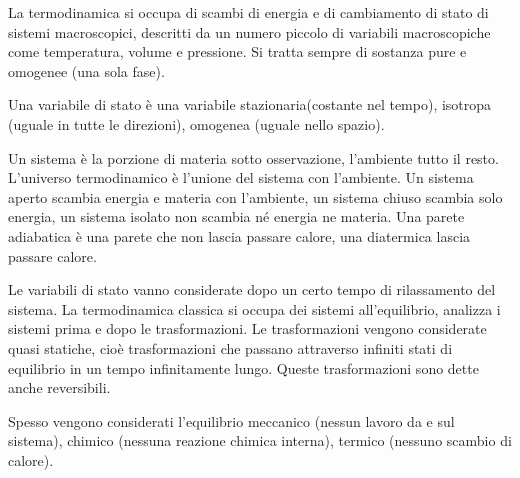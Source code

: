 La termodinamica si occupa di scambi di energia e di cambiamento di stato di sistemi macroscopici, descritti da un numero piccolo di variabili macroscopiche come temperatura, volume e pressione. Si tratta sempre di sostanza pure e omogenee (una sola fase).

Una variabile di stato è una variabile stazionaria(costante nel tempo), isotropa (uguale in tutte le direzioni), omogenea (uguale nello spazio).

Un sistema è la porzione di materia sotto osservazione, l'ambiente  tutto il resto. L'universo termodinamico è l'unione del sistema con l'ambiente. Un sistema aperto  scambia energia e materia con l'ambiente, un sistema chiuso  scambia solo energia, un sistema isolato non scambia né energia ne materia. Una parete adiabatica è una parete che non lascia passare calore, una diatermica lascia passare calore.

Le variabili di stato vanno considerate dopo un certo tempo di rilassamento del sistema. La termodinamica classica si occupa dei sistemi all'equilibrio, analizza i sistemi prima e dopo le trasformazioni. Le trasformazioni vengono considerate quasi statiche, cioè trasformazioni che passano attraverso infiniti stati di equilibrio in un tempo infinitamente lungo. Queste trasformazioni sono dette anche reversibili.

Spesso vengono considerati l'equilibrio meccanico (nessun lavoro da e sul sistema), chimico (nessuna reazione chimica interna), termico (nessuno scambio di calore).

